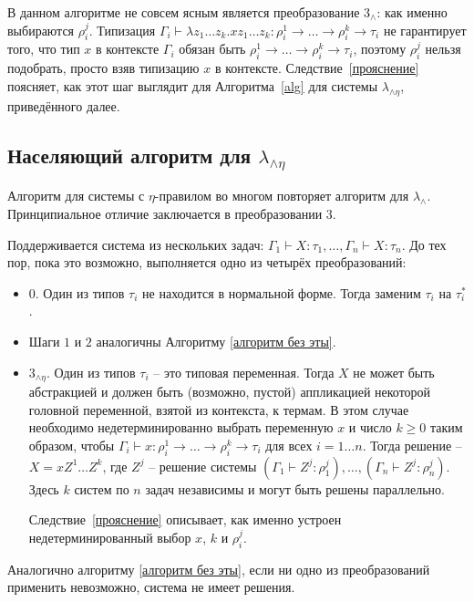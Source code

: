 \documentclass[../main.tex]{subfiles}
\begin{document}
В данном алгоритме не совсем ясным является преобразование $3_{\wedge}$: как именно выбираются $\rho_i^j$. Типизация $\Gamma_i \vdash \lambda z_1 \dots z_k . x z_1 \dots z_k : \rho_i^1 \to \dots \to \rho_i^k \to \tau_i$ не гарантирует того, что тип $x$ в контексте $\Gamma_i$ обязан быть $ \rho_i^1 \to \dots \to \rho_i^k \to \tau_i$, поэтому $\rho_i^j$ нельзя подобрать, просто взяв типизацию $x$ в контексте. Следствие~\ref{прояснение} поясняет, как этот шаг выглядит для Алгоритма~\ref{alg} для системы $\lambda_{\wedge \eta}$, приведённого далее.

\subsection{Населяющий алгоритм для $\lambda_{\wedge \eta}$}

Алгоритм для системы с $\eta$-правилом во многом повторяет алгоритм для $\lambda_\wedge$. Принципиальное отличие заключается в преобразовании $3$.
\begin{algorithm} \label{alg} 
Поддерживается система из нескольких задач: $\Gamma_1 \vdash X : \tau_1 ,\dots, \Gamma_n \vdash X : \tau_n$. До тех пор, пока это возможно, выполняется одно из четырёх преобразований: 

\begin{itemize}

     \item $0$. Один из типов $\tau_i$ не находится в нормальной форме. Тогда заменим $\tau_i$ на $\tau_i^*$.
     \item Шаги $1$ и $2$ аналогичны Алгоритму \ref{алгоритм без эты}.
     
     \item $3_{\wedge \eta}$. Один из типов $\tau_i$ -- это типовая переменная. Тогда $X$ не может быть абстракцией и должен быть (возможно, пустой) аппликацией некоторой головной переменной, взятой из контекста, к термам. В этом случае необходимо недетерминированно выбрать переменную $x$ и число $k \geqslant 0$ таким образом, чтобы $\Gamma_i \vdash x : \rho_i^1 \to \dots \to \rho_i^k \to \tau_i$ для всех $i = 1 \dots n$. Тогда решение --  $X = x Z^1 \dots Z^k$, где $Z^j$ -- решение системы $(\Gamma_1 \vdash Z^j : \rho_1^j) ,\dots, (\Gamma_n \vdash Z^j : \rho_n^j)$. Здесь $k$ систем по $n$ задач независимы и могут быть решены параллельно.
     
     Следствие~\ref{прояснение} описывает, как именно устроен недетерминированный выбор $x$, $k$ и $\rho_i^j$.
     
\end{itemize}

Аналогично алгоритму \ref{алгоритм без эты}, если ни одно из преобразований применить невозможно, система не имеет решения. 

\end{algorithm}
\end{document}
